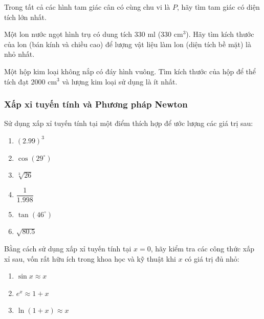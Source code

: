 \begin{exercise}
Trong tất cả các hình tam giác cân có cùng chu vi là $P$, hãy tìm tam giác có diện tích lớn nhất.
\end{exercise}

\begin{exercise}
Một lon nước ngọt hình trụ có dung tích 330 ml (330 cm$^3$). Hãy tìm kích thước của lon (bán kính và chiều cao) để lượng vật liệu làm lon (diện tích bề mặt) là nhỏ nhất.
\end{exercise}

\begin{exercise}
Một hộp kim loại không nắp có đáy hình vuông. Tìm kích thước của hộp để thể tích đạt 2000 cm$^3$ và lượng kim loại sử dụng là ít nhất.
\end{exercise}

\subsubsection{Xấp xỉ tuyến tính và Phương pháp Newton}

\begin{exercise}
Sử dụng xấp xỉ tuyến tính tại một điểm thích hợp để ước lượng các giá trị sau:
\begin{enumerate}[label=(\alph*)]
    \item $(2.99)^3$
    \item $\cos(29^\circ)$
    \item $\sqrt[3]{26}$
    \item $\dfrac{1}{1.998}$
    \item $\tan(46^\circ)$
    \item $\sqrt{80.5}$
\end{enumerate}
\end{exercise}

\begin{exercise}
Bằng cách sử dụng xấp xỉ tuyến tính tại $x=0$, hãy kiểm tra các công thức xấp xỉ sau, vốn rất hữu ích trong khoa học và kỹ thuật khi $x$ có giá trị đủ nhỏ:
\begin{enumerate}[label=(\alph*)]
    \item $\sin x \approx x$
    \item $e^x \approx 1 + x$
    \item $\ln(1+x) \approx x$
\end{enumerate}
\end{exercise}

